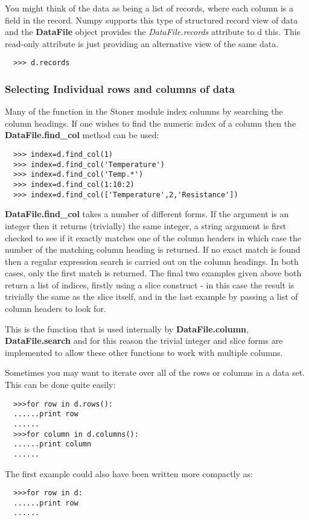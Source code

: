\documentclass[a4paper,11pt]{scrartcl}
\begin{document}
You might think of the data as being a list of records, where each column is a field in the record. Numpy supports this type of structured record view of data and the \textbf{DataFile} object provides the \textit{DataFile.records} attribute to d this. This read-only attribute is just providing an alternative view of the same data.

\begin{verbatim}
  >>> d.records
\end{verbatim}

\subsubsection{Selecting Individual rows and columns of data}

Many of the function in the Stoner module index columns by searching the column headings. If one wishes to find the numeric index of a column then the \textbf{DataFile.find\_col} method can be used:

\begin{verbatim}
  >>> index=d.find_col(1)
  >>> index=d.find_col('Temperature')
  >>> index=d.find_col('Temp.*')
  >>> index=d.find_col(1:10:2)
  >>> index=d.find_col(['Temperature',2,'Resistance'])
\end{verbatim}

 \textbf{DataFile.find\_col} takes a number of different forms. If the argument is an integer then it returns (trivially) the same integer, a string argument is first checked to see if it exactly matches one of the column headers in which case the number of the matching column heading is returned. If no exact match is found then a regular expression search is carried out on the column headings. In both cases, only the first match is returned. The final two examples given above both return a list of indices, firstly using a slice construct - in this case the result is trivially the same as the slice itself, and in the last example by passing a list of column headers to look for.

This is the function that is used internally by \textbf{DataFile.column}, \textbf{DataFile.search} \etc and for this reason the trivial integer and slice forms are implemented to allow these other functions to work with multiple columns.

Sometimes you may want to iterate over all of the rows or columns in a data set. This can be done quite easily:
\begin{verbatim}
  >>>for row in d.rows():
  ......print row
  ......
  >>>for column in d.columns():
  ......print column
  ......
\end{verbatim}
The first example could also have been written more compactly as:
\begin{verbatim}
  >>>for row in d:
  ......print row
  ......
\end{verbatim}
\end{document}
